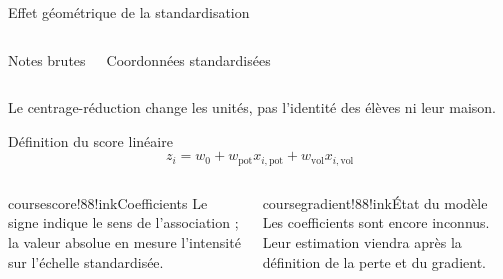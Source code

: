 \begin{frame}[t]{Effet géométrique de la standardisation}
  \centering
  \begin{columns}[T,onlytextwidth]
      \centering\small Notes brutes
      \centering\small Coordonnées standardisées
  \end{columns}
  \vfill
  Le centrage-réduction change les unités, pas l'identité des élèves ni leur maison.
\end{frame}


\begin{frame}[t]{Définition du score linéaire}
  \vspace{5mm}
  \[
    \boxed{z_i=w_0+w_{\mathrm{pot}}x_{i,\mathrm{pot}}
                    +w_{\mathrm{vol}}x_{i,\mathrm{vol}}}
  \]
  \vspace{4mm}
  \begin{columns}[T,onlytextwidth]
      \begin{coursecallout}{coursescore!88!ink}{Coefficients}
        Le signe indique le sens de l'association ; la valeur absolue en mesure
        l'intensité sur l'échelle standardisée.
      \end{coursecallout}
      \begin{coursecallout}{coursegradient!88!ink}{État du modèle}
        Les coefficients sont encore inconnus. Leur estimation viendra après
        la définition de la perte et du gradient.
      \end{coursecallout}
  \end{columns}
\end{frame}

